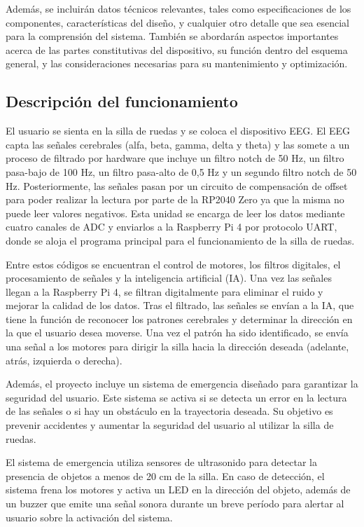 \documentclass{article}
\begin{document}
Además, se incluirán datos técnicos relevantes, tales como especificaciones de los componentes, características del diseño, y cualquier otro detalle que sea esencial para la comprensión del sistema. También se abordarán aspectos importantes acerca de las partes constitutivas del dispositivo, su función dentro del esquema general, y las consideraciones necesarias para su mantenimiento y optimización.

\subsection{Descripción del funcionamiento}
El usuario se sienta en la silla de ruedas y se coloca el dispositivo EEG. El EEG capta las señales cerebrales (alfa, beta, gamma, delta y theta) y las somete a un proceso de filtrado por hardware que incluye un filtro notch de 50 Hz, un filtro pasa-bajo de 100 Hz, un filtro pasa-alto de 0,5 Hz y un segundo filtro notch de 50 Hz. Posteriormente, las señales pasan por un circuito de compensación de offset para poder realizar la lectura por parte de la RP2040 Zero ya que la misma no puede leer valores negativos. Esta unidad se encarga de leer los datos mediante cuatro canales de ADC y enviarlos a la Raspberry Pi 4 por protocolo UART, donde se aloja el programa principal para el funcionamiento de la silla de ruedas.

Entre estos códigos se encuentran el control de motores, los filtros digitales, el procesamiento de señales y la inteligencia artificial (IA). Una vez las señales llegan a la Raspberry Pi 4, se filtran digitalmente para eliminar el ruido y mejorar la calidad de los datos. Tras el filtrado, las señales se envían a la IA, que tiene la función de reconocer los patrones cerebrales y determinar la dirección en la que el usuario desea moverse. Una vez el patrón ha sido identificado, se envía una señal a los motores para dirigir la silla hacia la dirección deseada (adelante, atrás, izquierda o derecha).

Además, el proyecto incluye un sistema de emergencia diseñado para garantizar la seguridad del usuario. Este sistema se activa si se detecta un error en la lectura de las señales o si hay un obstáculo en la trayectoria deseada. Su objetivo es prevenir accidentes y aumentar la seguridad del usuario al utilizar la silla de ruedas.

El sistema de emergencia utiliza sensores de ultrasonido para detectar la presencia de objetos a menos de 20 cm de la silla. En caso de detección, el sistema frena los motores y activa un LED en la dirección del objeto, además de un buzzer que emite una señal sonora durante un breve período para alertar al usuario sobre la activación del sistema.
\end{document}

